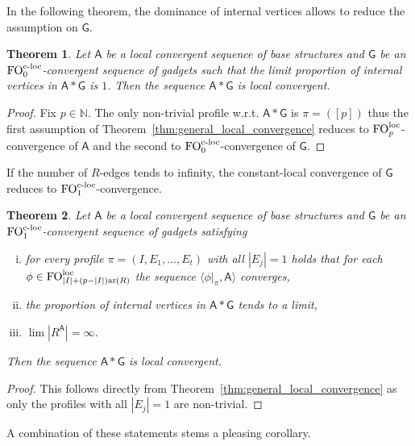 \documentclass[11pt]{article}
\theoremstyle{plain}
\newtheorem{theorem}{Theorem}[section]
\theoremstyle{definition}
\theoremstyle{remark}
\DeclareMathOperator\aritysym{ar}
\newcommand{\arity}[1]{{\aritysym({#1})}}
\newcommand{\N}{\mathbb{N}}
\DeclareMathOperator\FO{FO}
\newcommand{\FOloc}[1]{\FO_{#1}^\textnormal{loc}}
\newcommand{\FOcloc}[1]{\FO_{#1}^{\textnormal{c-loc}}}
\newcommand{\stonepar}[2]{\langle #1, #2 \rangle}
\newcommand{\strseq}[1]{{\boldsymbol{\mathsf{#1}}}}
\begin{document}
In the following theorem, the dominance of internal vertices allows to reduce the assumption on $\strseq{G}$.

\begin{theorem}\label{thm:fo_dominant_internal_vertices}
    Let $\strseq{A}$ be a local convergent sequence of base structures and $\strseq{G}$ be an $\FOcloc{0}$-convergent sequence of gadgets such that the limit proportion of internal vertices in $\strseq{A}*\strseq{G}$ is $1$.
    Then the sequence $\strseq{A}*\strseq{G}$ is local convergent.
\end{theorem}
\begin{proof}
    Fix $p \in \N$.
    The only non-trivial profile w.r.t. $\strseq{A}*\strseq{G}$ is $\pi = ([p])$ thus the first assumption of Theorem~\ref{thm:general_local_convergence} reduces to $\FOloc{p}$-convergence of $\strseq{A}$ and the second to $\FOcloc{0}$-convergence of $\strseq{G}$.
\end{proof}

If the number of $R$-edges tends to infinity, the constant-local convergence of $\strseq{G}$ reduces to $\FOcloc{1}$-convergence.

\begin{theorem}\label{thm:fo_general_conditioning_with_infinitely_many_r_edges}
    Let $\strseq{A}$ be a local convergent sequence of base structures and $\strseq{G}$ be an $\FOcloc{1}$-convergent sequence of gadgets satisfying
    \begin{enumerate}[(i)]
        \item for every profile $\pi = (I,E_1, \dots, E_t)$ with all $|E_j| = 1$ holds that for each $\phi \in \FOloc{|I|+(p-|I|)\arity{R}}$ the sequence $\stonepar{\phi|_\pi}{\strseq{A}}$ converges,
        \item the proportion of internal vertices in $\strseq{A}*\strseq{G}$ tends to a limit,
        \item $\lim |R^\strseq{A}| = \infty$.
    \end{enumerate}
    Then the sequence $\strseq{A}*\strseq{G}$ is local convergent.
\end{theorem}
\begin{proof}
    This follows directly from Theorem~\ref{thm:general_local_convergence} as only the profiles with all $|E_j| = 1$ are non-trivial.
\end{proof}

A combination of these statements stems a pleasing corollary.
\end{document}
